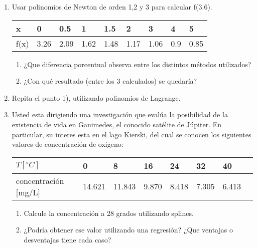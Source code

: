 \documentclass[a4paper,11pt]{article}
\theoremstyle{mytheor}
\begin{document}
\begin{enumerate}
    \item Usar polinomios de Newton de orden 1,2 y 3 para calcular f(3.6).
        \begin{table}[h!]
        \centering
        \begin{tabular}{l|llllllll}
        \hline
        x & 0    & 0.5  & 1    & 1.5  & 2    & 3    & 4   & 5    \\ \hline
        f(x) & 3.26 & 2.09 & 1.62 & 1.48 & 1.17 & 1.06 & 0.9 & 0.85 \\ \hline
        \end{tabular}
        \end{table}
        \begin{enumerate}
            \item ¿Que diferencia porcentual observa entre los distintos métodos utilizados?
            \item ¿Con qué resultado (entre los 3 calculados) se quedaría?
        \end{enumerate}
   
    
    \item Repita el punto 1), utilizando polinomios de Lagrange.



\item Usted esta dirigiendo una investigación que evalúa la posibilidad de la existencia de vida en Ganimedes, el conocido satélite de Júpiter. En particular, su interes esta en el lago Kierski, del cual se conocen los siguientes valores de concentración de oxigeno:

        \begin{table}[h!]
        \centering
        \begin{tabular}{l|lllllll}
        \hline
        $T[ ^\circ C]$ & 0    & 8  & 16    & 24  & 32    & 40   \\ \hline
        concentración [mg/L] & 14.621 & 11.843 & 9.870 & 8.418 & 7.305 & 6.413 \\ \hline
        \end{tabular}
        \end{table}

        \begin{enumerate}
            \item Calcule la concentración a 28 grados utilizando splines.
            \item ¿Podría obtener ese valor utilizando una regresión? ¿Que ventajas o desventajas tiene cada caso?
        \end{enumerate}


\end{enumerate}
\end{document}
